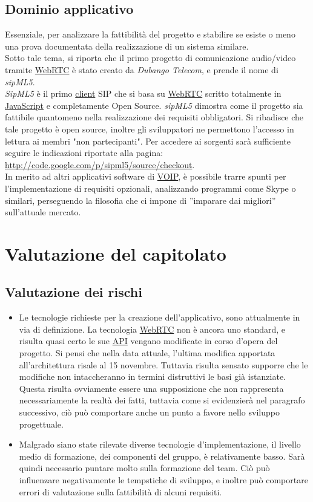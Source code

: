 \subsection{Dominio applicativo}
Essenziale, per analizzare la fattibilità del progetto e stabilire se esiste o meno una prova documentata della realizzazione di un sistema similare.\\ Sotto tale tema, si riporta che il primo progetto di comunicazione audio/video tramite \underline{WebRTC} è stato creato da \textit{Dubango Telecom}, e prende il nome di \textit{sipML5}.\\ \textit{SipML5} è il primo \underline{client} SIP che si basa su \underline{WebRTC} scritto totalmente in \underline{JavaScript} e completamente Open Source. \textit{sipML5} dimostra come il progetto sia fattibile quantomeno nella realizzazione dei requisiti obbligatori. Si ribadisce che tale progetto è open source, inoltre gli sviluppatori ne permettono l'accesso in lettura ai membri "non partecipanti". Per accedere ai sorgenti sarà sufficiente seguire le indicazioni riportate alla pagina: \url{http://code.google.com/p/sipml5/source/checkout}.\\In merito ad altri applicativi software di \underline{VOIP}, è possibile trarre spunti per l'implementazione di requisiti opzionali, analizzando programmi come Skype o similari, perseguendo la filosofia che ci impone di ''imparare dai migliori'' sull'attuale mercato.
\clearpage
\section{Valutazione del capitolato}

\subsection{Valutazione dei rischi}
\begin{itemize}
	\item Le tecnologie richieste per la creazione dell'applicativo, sono attualmente in via di definizione. La tecnologia \underline{WebRTC} non è ancora uno standard, e risulta quasi certo le sue \underline{API} vengano modificate in corso d'opera del progetto. Si pensi che nella data attuale, l'ultima modifica apportata all'architettura risale al 15 novembre. Tuttavia risulta sensato supporre che le modifiche non intaccheranno in termini distruttivi le basi già istanziate. Questa risulta ovviamente essere una supposizione che non rappresenta necessariamente la realtà dei fatti, tuttavia come si evidenzierà nel paragrafo successivo, ciò può comportare anche un punto a favore nello sviluppo progettuale.
	\item Malgrado siano state rilevate diverse tecnologie d'implementazione, il livello medio di formazione, dei componenti del gruppo, è relativamente basso. Sarà quindi necessario puntare molto sulla formazione del team. Ciò può influenzare negativamente le tempstiche di sviluppo, e inoltre può comportare errori di valutazione sulla fattibilità di alcuni requisiti.
\end{itemize}

